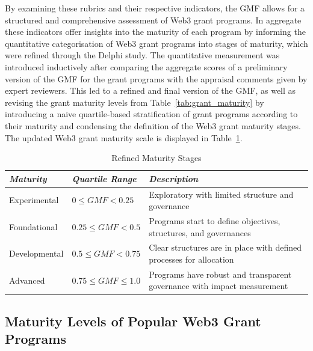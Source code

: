 \documentclass[conference]{IEEEtran}
\begin{document}
By examining these rubrics and their respective indicators, the GMF allows for a structured and comprehensive assessment of Web3 grant programs. In aggregate these indicators offer insights into the maturity of each program by informing the quantitative categorisation of Web3 grant programs into stages of maturity, which were refined through the Delphi study. The quantitative measurement was introduced inductively after comparing the aggregate scores of a preliminary version of the GMF for the grant programs with the appraisal comments given by expert reviewers. This led to a refined and final version of the GMF, as well as revising the grant maturity levels from Table~\ref{tab:grant_maturity} by introducing a naive quartile-based stratification of grant programs according to their maturity and condensing the definition of the Web3 grant maturity stages. The updated Web3 grant maturity scale is displayed in Table~\ref{tab:revised_maturity_stages}.

\begin{table}[htbp]
\caption{Refined Maturity Stages}
\centering
\footnotesize
\begin{tabular}{p{1.5cm}p{2.5cm}p{3.5cm}}
\hline
\textbf{\textit{Maturity}} & \textbf{\textit{Quartile Range}} & \textbf{\textit{Description}} \\
\hline
Experimental & \( 0 \leq GMF < 0.25 \) & Exploratory with limited structure and governance \\
Foundational & \( 0.25 \leq GMF < 0.5 \) & Programs start to define objectives, structures, and governances \\
Developmental & \( 0.5 \leq GMF < 0.75 \) & Clear structures are in place with defined processes for allocation \\
Advanced & \( 0.75 \leq GMF \leq 1.0 \) & Programs have robust and transparent governance with impact measurement \\
\hline
\end{tabular}
\label{tab:revised_maturity_stages}
\end{table}

\subsection{Maturity Levels of Popular Web3 Grant Programs}\label{sec_4.2}
\end{document}
